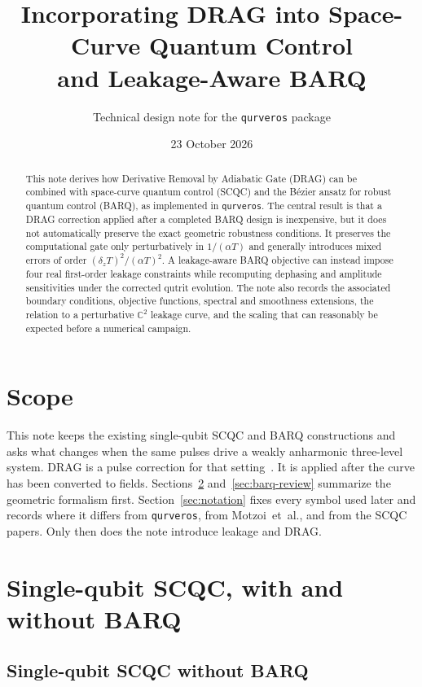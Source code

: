 \documentclass[11pt,a4paper]{article}
\title{Incorporating DRAG into Space-Curve Quantum Control\\
and Leakage-Aware BARQ}
\author{Technical design note for the \texttt{qurveros} package}
\date{23 October 2026}
\theoremstyle{definition}
\begin{document}
\maketitle

\begin{abstract}
This note derives how Derivative Removal by Adiabatic Gate (DRAG) can be
combined with space-curve quantum control (SCQC) and the B\'ezier ansatz for
robust quantum control (BARQ), as implemented in \texttt{qurveros}.  The
central result is that a DRAG correction applied after a completed BARQ design
is inexpensive, but it does not automatically preserve the exact geometric
robustness conditions.  It preserves the computational gate only
perturbatively in \(1/(\alpha T)\) and generally introduces mixed errors of
order \((\delta_z T)^2/(\alpha T)^2\).  A leakage-aware BARQ objective can
instead impose four real first-order leakage constraints while recomputing
dephasing and amplitude sensitivities under the corrected qutrit evolution.
The note also records the associated boundary conditions, objective functions,
spectral and smoothness extensions, the relation to a perturbative
\(\mathbb{C}^2\) leakage curve, and the scaling that can reasonably be
expected before a numerical campaign.
\end{abstract}

\tableofcontents

\section{Scope}

This note keeps the existing single-qubit SCQC and BARQ constructions and asks
what changes when the same pulses drive a weakly anharmonic three-level
system.  DRAG is a pulse correction for that setting~\cite{Motzoi2009}.  It is
applied after the curve has been converted to fields.  Sections~\ref{sec:scqc}
and~\ref{sec:barq-review} summarize the geometric formalism first.
Section~\ref{sec:notation} fixes every symbol used later and records where it
differs from \texttt{qurveros}, from Motzoi~et~al., and from the SCQC papers.
Only then does the note introduce leakage and DRAG.

\section{Single-qubit SCQC, with and without BARQ}
\label{sec:scqc}

\subsection{Single-qubit SCQC without BARQ}
\label{sec:scqc-single}
\end{document}

